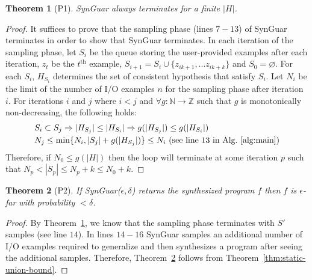 \documentclass[11pt]{extarticle}
\newtheorem{theorem}{Theorem}[section]
\newcommand{\tool}{{\sc SynGuar}\xspace}
\begin{document}
\begin{theorem}[P1]
\label{thm:p1}
\tool always terminates for a finite $|H|$.
\end{theorem}
\begin{proof}
It suffices to prove that the sampling phase (lines $7-13$) of \tool terminates in order to show that \tool terminates.
In each iteration of the sampling phase,  let $S_i$ be the queue storing the user-provided examples after each iteration, $z_t$ be the $t^\text{th}$ example, $S_{i+1} = S_{i}\cup \{z_{ik+1},...z_{ik+k}\}$ and $S_0=\varnothing$. For each $S_i$, $H_{S_i}$ determines the set of consistent hypothesis that satisfy $S_i$. Let $N_i$ be the limit of  the number of I/O examples $n$ for the sampling phase after iteration $i$. 
For iterations $i$ and $j$ where $i<j$ and $\forall g:\mathbb{N} \rightarrow \mathbb{Z}$ such that $g$ is monotonically non-decreasing, the following holds: 
\begin{align*}
  &S_i\subset S_j \Rightarrow |H_{S_j}|\leq |H_{S_i}| \Rightarrow g(|H_{S_j}|) \leq g(|H_{S_i}|)\\
  &N_j \leq \min\{N_i, |S_j| + g(|H_{S_j}|)\} \leq N_i \text{ (see line $13$ in Alg.~\ref{alg:main})}
\end{align*}
Therefore, if $N_0 \leq g(|H|)$ then the loop will terminate at some iteration $p$ such that $N_p < |S_p| \leq N_p + k \leq N_0 + k$.
\end{proof}

\begin{theorem}[P2]
\label{thm:p2}
If \tool($\epsilon, \delta$) returns the synthesized program $f$ then $f$ is $\epsilon$-far with probability $<\delta$.
\end{theorem}
\begin{proof}
By Theorem~\ref{thm:p1}, we know that the sampling phase terminates with $S'$ samples (see line $14$). In lines $14-16$ \tool samples an additional number of I/O examples required to generalize and then synthesizes a program after seeing the additional samples. Therefore, Theorem~\ref{thm:p2} follows from Theorem~\ref{thm:static-union-bound}.
\end{proof}


\end{document}
